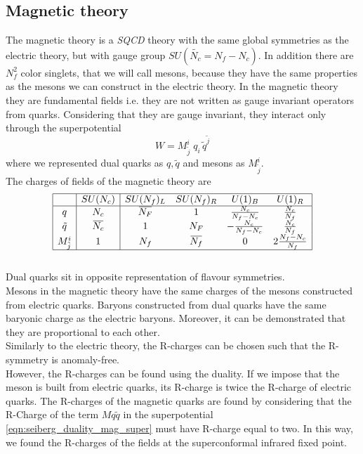\subsection{Magnetic theory}
The magnetic theory is a \emph{SQCD} theory with the same global symmetries as the electric theory, but with gauge group $SU(\tilde{N_c}=N_f - N_c)$. 
In addition there are $N_f^2$ color singlets, that we will call mesons, because they have the same properties as the mesons we can construct in the electric theory.
In the magnetic theory they are fundamental fields i.e. they are not written as gauge invariant operators from quarks. 
Considering that they are gauge invariant, they interact only through the superpotential
\begin{equation}
 W  = M^i_{\tilde{j}} \; q_i \, \tilde{q}^{\tilde{j}}
 \label{eqn:seiberg_duality_mag_super}
\end{equation}
where we represented dual quarks as $q,\tilde{q}$ and mesons as $M^i_{\tilde{j}} $.\\
The charges of fields of the magnetic theory are
\begin{equation}
 \begin{array}{| c | c |  c c c c | @{}c@{} }
 \hline
 & SU(N_c) & SU(N_f)_L  &SU(N_f)_R   & U(1)_B &  U(1)_R \\
\hline
q & N_c & \overbar{N_F} & 1   &   \frac{N_c}{N_f-N_c}   &  \frac{N_c}{N_f}  \\
\tilde{q} &\overbar{N_c}  &  1 & { N_F}   & - \frac{N_c}{N_f-N_c}   &   \frac{N_c}{N_f}   \\	 
M^i_{\tilde{j}}  &  1  & N_f & \overbar{N_f}  & 0 &  2 \frac{N_f - N_c}{N_f}\\ 
\hline
 \end{array}
 \label{tab:sun_magnetich_charges}
\end{equation}\\
Dual quarks sit in opposite representation of flavour symmetries. 
\\
Mesons in the magnetic theory have the same charges of the mesons constructed from electric quarks.
Baryons constructed from dual quarks have the same baryonic charge as the electric baryons.
Moreover, it can be demonstrated that they are proportional to each other.\\
Similarly to the electric theory, the R-charges can be chosen such that the R-symmetry is anomaly-free.\\
However, the R-charges can be found using the duality.
If we impose that the meson is built from electric quarks, its R-charge is twice the R-charge of electric quarks.
The R-charges of the magnetic quarks are found by considering that the R-Charge of the term $M q \tilde{q}$ in the superpotential \eqref{eqn:seiberg_duality_mag_super} must have R-charge equal to two.
In this way, we found the R-charges of the fields at the superconformal infrared fixed point.



